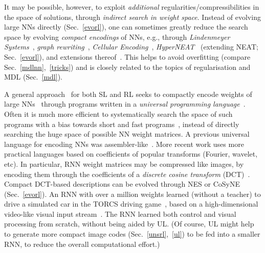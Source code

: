 \documentclass[letterpaper]{article}
\begin{document}
\begin{CJK*}{UTF8}{gbsn}
\begin{sloppypar}
It may be possible, however, to exploit {\em additional} regularities/compressibilities 
in the space of solutions, through {\em indirect search in weight space}.
Instead of evolving large NNs directly (Sec.~\ref{evorl}), one can sometimes greatly reduce
the search space by evolving 
{\em compact encodings} of NNs, e.g.,  through  {\em Lindenmeyer Systems}~\citep{lindenmayer68,lindenmayer94}, {\em graph rewriting}~\citep{kitano90}, {\em Cellular Encoding}~\citep{gruau:tr96-048}, {\em HyperNEAT}~\citep{stanley07,stanley09,clune2011,vandenberg2013} (extending
NEAT; Sec.~\ref{evorl}), and extensions thereof~\citep[e.g.,][]{risi2012}. 
This helps to avoid overfitting (compare Sec.~\ref{mdlnn},~\ref{tricks}) and is 
closely related to the topics of regularisation 
and MDL (Sec.~\ref{mdl}).

A general approach~\citep{Schmidhuber:97nn+} for both SL and RL seeks to compactly encode weights of large NNs~\citep{Schmidhuber:97nn+} through programs written in a {\em universal programming language}~\citep{Goedel:31,Church:36,Turing:36,Post:36}. Often it is much more efficient to systematically search the space of such programs with a bias towards short and fast 
programs~\citep{Levin:73,Schmidhuber:97nn+,Schmidhuber:04oops}, 
instead of directly 
searching the huge space of possible NN weight matrices.
A previous 
universal language for encoding NNs  was assembler-like~\citep{Schmidhuber:97nn+}. More recent work uses more practical languages based on coefficients of popular transforms (Fourier, wavelet, etc). 
In particular, 
 RNN weight matrices may be compressed like images, by encoding them through the coefficients of a 
{\em discrete cosine transform} (DCT)~\citep{koutnik:gecco10,koutnik:gecco13}.
Compact DCT-based descriptions can be evolved through NES or CoSyNE
(Sec.~\ref{evorl}).
An RNN with over a million weights learned (without a teacher) to drive a simulated car 
in the TORCS driving game~\citep{wcci:torcs:09,torcs-manual:2011},
based on a high-dimensional video-like visual input stream~\citep{koutnik:gecco13}.
The RNN learned both control and visual processing from scratch, without being
aided by UL. (Of course, UL might help to generate more compact image codes
(Sec.~\ref{unsrl},~\ref{ul})
 to be fed into a smaller RNN, 
to reduce the overall computational effort.) 


\end{sloppypar}
\end{CJK*}
\end{document}
